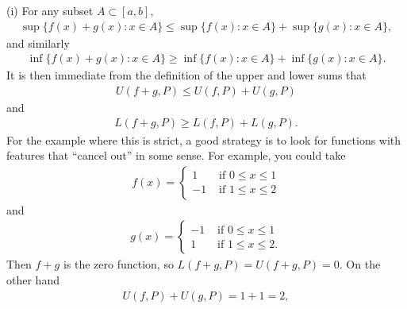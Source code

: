 \documentclass[letterpaper,10pt,english]{jupyterBook}
\begin{document}
\sphinxAtStartPar
(i) For any subset \(A\subset[a,b]\),
\begin{equation*}
\begin{split}
\sup\{f(x)+g(x):x\in A\} \leq \sup\{f(x):x\in A\} + \sup\{g(x):x\in A\},
\end{split}
\end{equation*}
\sphinxAtStartPar
and similarly
\begin{equation*}
\begin{split}
\inf\{f(x)+g(x):x\in A\} \geq \inf\{f(x):x\in A\} + \inf\{g(x):x\in A\}.
\end{split}
\end{equation*}
\sphinxAtStartPar
It is then immediate from the definition of the upper and lower sums that
\begin{equation*}
\begin{split}
U(f+g,P) \leq U(f,P)+U(g,P)
\end{split}
\end{equation*}
\sphinxAtStartPar
and
\begin{equation*}
\begin{split}
L(f+g,P) \geq L(f,P)+L(g,P).
\end{split}
\end{equation*}
\sphinxAtStartPar
For the example where this is strict, a good strategy is to look for functions with features that “cancel out” in some sense. For example, you could take
\begin{equation*}
\begin{split}
f(x) = \left\{\begin{array}{cc} 1 & \text{ if } 0\leq x\leq 1 \\  -1 & \text{ if } 1\leq x\leq 2\end{array}\right.
\end{split}
\end{equation*}
\sphinxAtStartPar
and
\begin{equation*}
\begin{split}
g(x) = \left\{\begin{array}{cc} -1 & \text{ if } 0\leq x\leq 1 \\  1 & \text{ if } 1\leq x\leq 2.\end{array}\right.
\end{split}
\end{equation*}
\sphinxAtStartPar
Then \(f+g\) is the zero function, so \(L(f+g,P)=U(f+g,P)=0\). On the other hand
\begin{equation*}
\begin{split}
U(f,P)+U(g,P) = 1+1 = 2,
\end{split}
\end{equation*}
\end{document}
